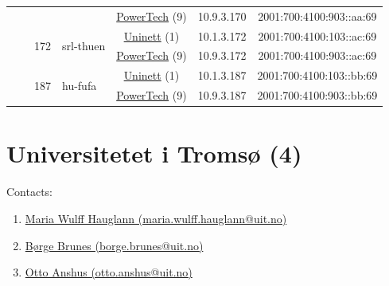 \begin{small}
\begin{center}
\begin{longtable}{|c|c|c|c|c|c|c|c|}
  &  &  &  & \multicolumn{2}{|c|}{\tiny{\href{http://www.powertech.no}{PowerTech} (9)}} & \tiny{10.9.3.170} & \tiny{2001:700:4100:903::aa:69} \\* \cline{3-3}\cline{4-4}\cline{5-5}\cline{6-6}\cline{7-7}\cline{8-8}
  &  & \multirow{2}{*}{\tiny{172}} & \multicolumn{1}{|l|}{\multirow{2}{*}{\tiny{srl-thuen}}} & \multicolumn{2}{|c|}{\tiny{\href{https://www.uninett.no}{Uninett} (1)}} & \tiny{10.1.3.172} & \tiny{2001:700:4100:103::ac:69} \\* \cline{5-5}\cline{6-6}\cline{7-7}\cline{8-8}
  &  &  &  & \multicolumn{2}{|c|}{\tiny{\href{http://www.powertech.no}{PowerTech} (9)}} & \tiny{10.9.3.172} & \tiny{2001:700:4100:903::ac:69} \\* \cline{3-3}\cline{4-4}\cline{5-5}\cline{6-6}\cline{7-7}\cline{8-8}
  &  & \multirow{2}{*}{\tiny{187}} & \multicolumn{1}{|l|}{\multirow{2}{*}{\tiny{hu-fufa}}} & \multicolumn{2}{|c|}{\tiny{\href{https://www.uninett.no}{Uninett} (1)}} & \tiny{10.1.3.187} & \tiny{2001:700:4100:103::bb:69} \\* \cline{5-5}\cline{6-6}\cline{7-7}\cline{8-8}
  &  &  &  & \multicolumn{2}{|c|}{\tiny{\href{http://www.powertech.no}{PowerTech} (9)}} & \tiny{10.9.3.187} & \tiny{2001:700:4100:903::bb:69} \\ \hline
\end{longtable}
\end{center}
\end{small}



\section{Universitetet i Tromsø (4)}
\label{sec:UiT}

Contacts:\begin{enumerate}
 \item {}\href{mailto:maria.wulff.hauglann@uit.no}{Maria Wulff Hauglann (maria.wulff.hauglann@uit.no)}
 \item {}\href{mailto:borge.brunes@uit.no}{Børge Brunes (borge.brunes@uit.no)}
 \item {}\href{mailto:otto.anshus@uit.no}{Otto Anshus (otto.anshus@uit.no)}
\end{enumerate}

